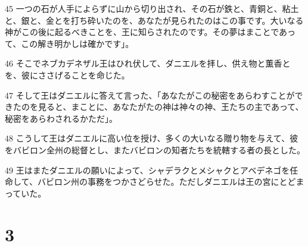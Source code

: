 \par 45 一つの石が人手によらずに山から切り出され、その石が鉄と、青銅と、粘土と、銀と、金とを打ち砕いたのを、あなたが見られたのはこの事です。大いなる神がこの後に起るべきことを、王に知らされたのです。その夢はまことであって、この解き明かしは確かです」。
\par 46 そこでネブカデネザル王はひれ伏して、ダニエルを拝し、供え物と薫香とを、彼にささげることを命じた。
\par 47 そして王はダニエルに答えて言った、「あなたがこの秘密をあらわすことができたのを見ると、まことに、あなたがたの神は神々の神、王たちの主であって、秘密をあらわされるかただ」。
\par 48 こうして王はダニエルに高い位を授け、多くの大いなる贈り物を与えて、彼をバビロン全州の総督とし、またバビロンの知者たちを統轄する者の長とした。
\par 49 王はまたダニエルの願いによって、シャデラクとメシャクとアベデネゴを任命して、バビロン州の事務をつかさどらせた。ただしダニエルは王の宮にとどまっていた。

\chapter{3}

